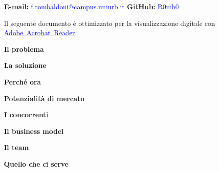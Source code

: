 \documentclass[hidelinks,aspectratio=169]{beamer}
\begin{document}
\begin{frame}
\begin{center}
		\vspace{5mm}
		\tiny{\textbf{E-mail: }\href{f.rombaldoni@campus.uniurb.it}{\textcolor{blue}{f.rombaldoni@campus.uniurb.it}} \hspace*{90mm} \textbf{GitHub: }\href{https://github.com/R0mb0}{\textcolor{blue}{R0mb0}} }
		\end{center}
	\end{frame}

	\begin{frame}
		\centering
		\fboxrule=2pt
		\fbox
		{
			\begin{minipage}{0.9\linewidth}
				\small{Il seguente documento è ottimizzato per la visualizzazione digitale con \href{https://get.adobe.com/it/reader/}{\textcolor{blue}{Adobe~Acrobat~Reader}}.}  
			\end{minipage}
		}
	\end{frame}
	
	
	\begin{frame}{\textbf{Il problema}}
		
	\end{frame}

	\begin{frame}{\textbf{La soluzione}}

	\end{frame}

	\begin{frame}{\textbf{Perché ora}}

	\end{frame}

	\begin{frame}{\textbf{Potenzialità di mercato}}

	\end{frame}

	\begin{frame}{\textbf{I concorrenti}}

	\end{frame}

	\begin{frame}{\textbf{Il business model}}

	\end{frame}
	
	\begin{frame}{\textbf{Il team}}

	\end{frame}

	\begin{frame}{\textbf{Quello che ci serve}}

	\end{frame}
	
\end{document}
